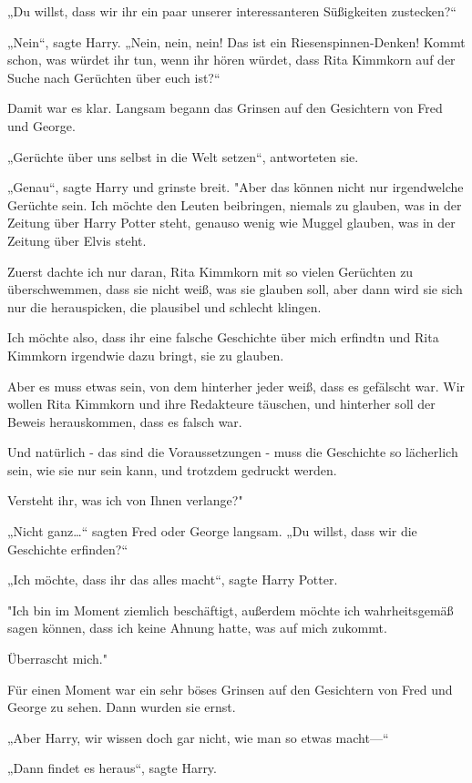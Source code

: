 {„Du willst, dass wir ihr ein paar unserer interessanteren Süßigkeiten zustecken?“

„Nein“, sagte Harry. „Nein, nein, nein! Das ist ein Riesenspinnen-Denken! Kommt schon, was würdet ihr tun, wenn ihr hören würdet, dass Rita Kimmkorn auf der Suche nach Gerüchten über euch ist?“

Damit war es klar. Langsam begann das Grinsen auf den Gesichtern von Fred und George.

„Gerüchte über uns selbst in die Welt setzen“, antworteten sie.

„Genau“, sagte Harry und grinste breit. "Aber das können nicht nur irgendwelche Gerüchte sein. Ich möchte den Leuten beibringen, niemals zu glauben, was in der Zeitung über Harry Potter steht, genauso wenig wie Muggel glauben, was in der Zeitung über Elvis steht.

Zuerst dachte ich nur daran, Rita Kimmkorn mit so vielen Gerüchten zu überschwemmen, dass sie nicht weiß, was sie glauben soll, aber dann wird sie sich nur die herauspicken, die plausibel und schlecht klingen.

Ich möchte also, dass ihr eine falsche Geschichte über mich erfindtn und Rita Kimmkorn irgendwie dazu bringt, sie zu glauben.

Aber es muss etwas sein, von dem hinterher jeder weiß, dass es gefälscht war. Wir wollen Rita Kimmkorn und ihre Redakteure täuschen, und hinterher soll der Beweis herauskommen, dass es falsch war.

Und natürlich - das sind die Voraussetzungen - muss die Geschichte so lächerlich sein, wie sie nur sein kann, und trotzdem gedruckt werden.

Versteht ihr, was ich von Ihnen verlange?"

„Nicht ganz…“ sagten Fred oder George langsam. „Du willst, dass wir die Geschichte erfinden?“

„Ich möchte, dass ihr das alles macht“, sagte Harry Potter.

"Ich bin im Moment ziemlich beschäftigt, außerdem möchte ich wahrheitsgemäß sagen können, dass ich keine Ahnung hatte, was auf mich zukommt.

Überrascht mich."

Für einen Moment war ein sehr böses Grinsen auf den Gesichtern von Fred und George zu sehen. Dann wurden sie ernst.

„Aber Harry, wir wissen doch gar nicht, wie man so etwas macht—“

„Dann findet es heraus“, sagte Harry.

}
